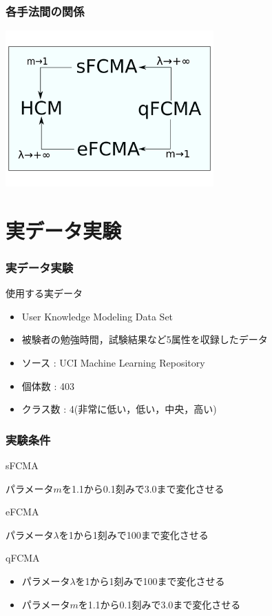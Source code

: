 \documentclass[13pt,dvipdfmx]{beamer}
\begin{document}
\begin{frame}\frametitle{各手法間の関係}
  \begin{center}
    \includegraphics[height=60mm]{method.png}
  \end{center}
\end{frame}

\section{実データ実験}
\begin{frame}\frametitle{実データ実験}
  \begin{block}{使用する実データ}
    \begin{itemize}
     \item User Knowledge Modeling Data Set
     \item 被験者の勉強時間，試験結果など5属性を収録したデータ
     \item ソース : UCI  Machine Learning Repository
     \item 個体数 : 403
     \item クラス数 : 4(非常に低い，低い，中央，高い)
    \end{itemize}
  \end{block}
\end{frame}

\begin{frame}\frametitle{実験条件} 
 \begin{block}{sFCMA}
  \begin{center}
   パラメータ$m$を1.1から0.1刻みで3.0まで変化させる
  \end{center}
 \end{block}
 \begin{block}{eFCMA}
  \begin{center}
   パラメータ$\lambda$を1から1刻みで100まで変化させる
  \end{center}
 \end{block}
 \begin{block}{qFCMA}
  \begin{itemize}
   \item パラメータ$\lambda$を1から1刻みで100まで変化させる
   \item パラメータ$m$を1.1から0.1刻みで3.0まで変化させる
  \end{itemize}
 \end{block}
\end{frame}
\end{document}
